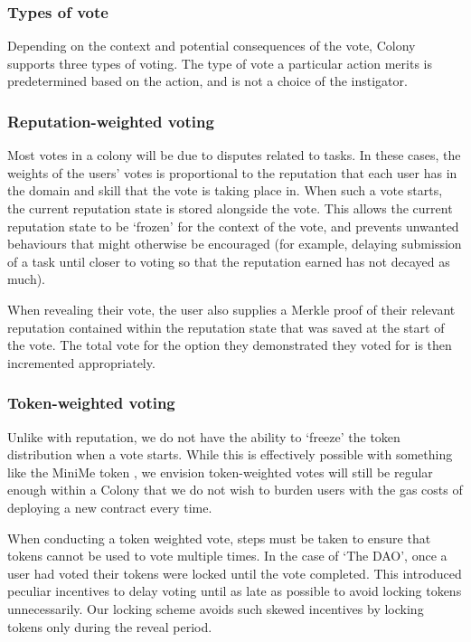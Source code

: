 \subsubsection{Types of vote}

Depending on the context and potential consequences of the vote, Colony supports three types of voting. The type of vote a particular action merits is predetermined based on the action, and is not a choice of the instigator.

\subsubsection*{Reputation-weighted voting}

Most votes in a colony will be due to disputes related to tasks. In these cases, the weights of the users' votes is proportional to the reputation that each user has in the domain and skill that the vote is taking place in. When such a vote starts, the current reputation state is stored alongside the vote. This allows the current reputation state to be `frozen' for the context of the vote, and prevents unwanted behaviours that might otherwise be encouraged (for example, delaying submission of a task until closer to voting so that the reputation earned has not decayed as much).

When revealing their vote, the user also supplies a Merkle proof of their relevant reputation contained within the reputation state that was saved at the start of the vote. The total vote for the option they demonstrated they voted for is then incremented appropriately.

\subsubsection*{Token-weighted voting}

Unlike with reputation, we do not have the ability to `freeze' the token distribution when a vote starts. While this is effectively possible with something like the MiniMe token \cite{minime}, we envision token-weighted votes will still be regular enough within a Colony that we do not wish to burden users with the gas costs of deploying a new contract every time.

When conducting a token weighted vote, steps must be taken to ensure that tokens cannot be used to vote multiple times. In the case of `The DAO', once a user had voted their tokens were locked until the vote completed. This introduced peculiar incentives to delay voting until as late as possible to avoid locking tokens unnecessarily.  Our locking scheme avoids such skewed incentives by locking tokens only during the reveal period.

